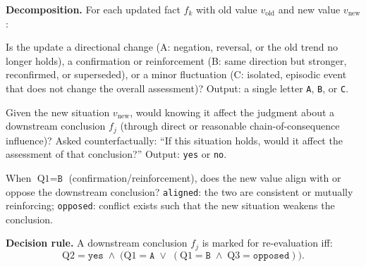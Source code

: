 \documentclass{article}
\theoremstyle{definition}
\begin{document}
\textbf{Decomposition.}  For each updated fact $f_k$ with old value
$v_{\text{old}}$ and new value $v_{\text{new}}$:

\begin{description}[style=nextline, leftmargin=1.8cm, labelwidth=1.5cm,
  labelsep=0.3cm, font=\normalfont\bfseries, itemsep=4pt, topsep=4pt]
\item[Q1---Change Type:] Is the update a directional
  change (A: negation, reversal, or the old trend no longer holds),
  a confirmation or reinforcement (B: same direction but stronger,
  reconfirmed, or superseded), or a minor fluctuation (C: isolated,
  episodic event that does not change the overall assessment)?
  Output: a single letter \texttt{A}, \texttt{B}, or \texttt{C}.

\item[Q2---Relevance:] Given the new situation
  $v_{\text{new}}$, would knowing it affect the judgment about a
  downstream conclusion $f_j$ (through direct or reasonable
  chain-of-consequence influence)?  Asked counterfactually:
  ``If this situation holds, would it affect the assessment of that
  conclusion?''  Output: \texttt{yes} or \texttt{no}.

\item[Q3---Stance:] When $\text{Q1}=\texttt{B}$
  (confirmation/reinforcement), does the new value align with or
  oppose the downstream conclusion?  \texttt{aligned}: the two are
  consistent or mutually reinforcing; \texttt{opposed}: conflict
  exists such that the new situation weakens the conclusion.
\end{description}

\textbf{Decision rule.}  A downstream conclusion $f_j$ is marked for
re-evaluation iff:
\begin{equation}
  \text{Q2}=\texttt{yes}\;\land\;\big(\text{Q1}=\texttt{A}\;\lor\;
  (\text{Q1}=\texttt{B}\;\land\;\text{Q3}=\texttt{opposed})\big).
  \label{eq:decision}
\end{equation}
\end{document}
